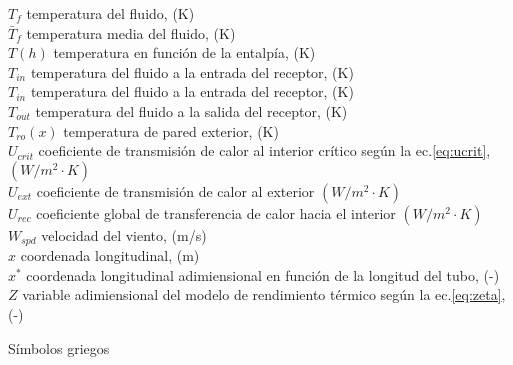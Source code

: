 \begin{tabbing}
$T_{f}$ \> temperatura del fluido, (K) \\
$\bar{T}_{f}$ \> temperatura media del fluido, (K) \\
$T(h)$ \> temperatura en función de la entalpía, (K) \\
$T_{in}$ \> temperatura del fluido a la entrada del receptor, (K) \\
$T_{in}$ \>  temperatura del fluido a la entrada del receptor, (K) \\
$T_{out}$ \> temperatura del fluido a la salida del receptor, (K) \\
$T_{ro}(x)$ \> temperatura de pared exterior, (K) \\
$U_{crit}$ \>  coeficiente de transmisión de calor al interior crítico según la ec.\eqref{eq:ucrit}, $(W/m^{2}\cdot K)$  \\
$U_{ext}$ \> coeficiente de transmisión de calor al exterior $(W/m^{2}\cdot K)$  \\
$U_{rec}$  \> coeficiente global de transferencia de calor hacia el interior $(W/m^{2}\cdot K)$  \\
$W_{spd}$ \> velocidad del viento, (m/s) \\
$x$ \> coordenada longitudinal, (m) \\
$x^*$ \> coordenada longitudinal adimiensional en función de la longitud del tubo, (-) \\
$Z$ \> variable adimiensional del modelo de rendimiento térmico según la ec.\eqref{eq:zeta}, (-) \\
\end{tabbing}


Símbolos griegos

